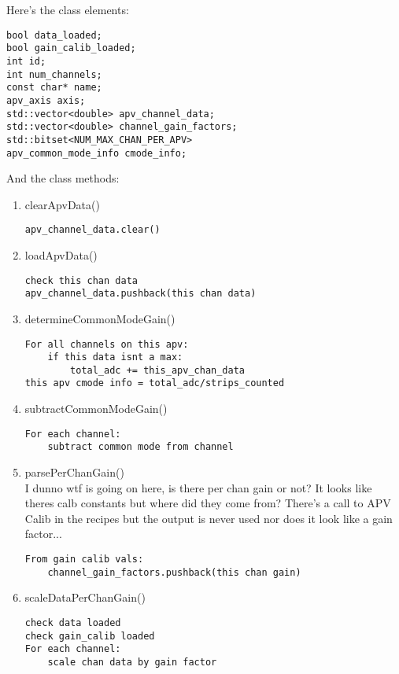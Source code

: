 \documentclass[11pt]{article}
\begin{document}
	Here's the class elements:
	\begin{lstlisting} 
bool data_loaded;
bool gain_calib_loaded;
int id;
int num_channels;
const char* name;
apv_axis axis;
std::vector<double> apv_channel_data;
std::vector<double> channel_gain_factors;
std::bitset<NUM_MAX_CHAN_PER_APV>
apv_common_mode_info cmode_info;
	\end{lstlisting}
	
	And the class methods:
	\begin{enumerate}
		\item clearApvData()
		\begin{lstlisting}
apv_channel_data.clear()
		\end{lstlisting}
		
		\item loadApvData()
		\begin{lstlisting}
check this chan data
apv_channel_data.pushback(this chan data)
		\end{lstlisting}
	
		\item determineCommonModeGain()
		\begin{lstlisting}
For all channels on this apv:
	if this data isnt a max:
		total_adc += this_apv_chan_data
this apv cmode info = total_adc/strips_counted
		\end{lstlisting}
		
		\item subtractCommonModeGain()
		\begin{lstlisting}
For each channel:
	subtract common mode from channel
		\end{lstlisting}
		
		\item parsePerChanGain() \\
I dunno wtf is going on here, is there per chan gain or not? It looks like theres calb constants but where did they come from? There's a call to APV Calib in the recipes but the output is never used nor does it look like a gain factor...	
		\begin{lstlisting}
From gain calib vals:
	channel_gain_factors.pushback(this chan gain)
		\end{lstlisting}

		\item scaleDataPerChanGain()
		\begin{lstlisting}
check data loaded
check gain_calib loaded
For each channel:
	scale chan data by gain factor
		\end{lstlisting}
		
	\end{enumerate}
	
\end{document}

